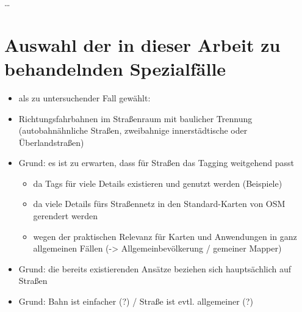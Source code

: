 \documentclass[../main/thesis.tex]{subfiles}
\begin{document}
…





\section{Auswahl der in dieser Arbeit zu behandelnden Spezialfälle}

\begin{itemize}
	
	
	\item als zu untersuchender Fall gewählt:
	
	\item Richtungsfahrbahnen im Straßenraum mit baulicher Trennung
		(autobahnähnliche Straßen, zweibahnige innerstädtische oder Überlandstraßen)
	
	\item Grund: es ist zu erwarten, dass für Straßen das Tagging weitgehend passt
	\begin{itemize}
		\item da Tags für viele Details existieren und genutzt werden (Beispiele)
		\item da viele Details fürs Straßennetz in den Standard-Karten von OSM gerendert werden
		\item wegen der praktischen Relevanz für Karten und Anwendungen in ganz allgemeinen Fällen
			(-> Allgemeinbevölkerung / gemeiner Mapper)
	\end{itemize}
	\item Grund: die bereits existierenden Ansätze beziehen sich hauptsächlich auf Straßen
	\item Grund: Bahn ist einfacher (?) / Straße ist evtl. allgemeiner (?)
	
	

\end{itemize}
\end{document}
